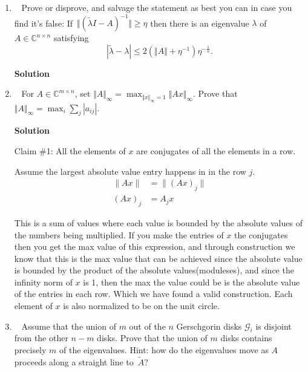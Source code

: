 \documentclass[11pt]{article}
\newcommand\score[1]{\marginpar{\vspace{-2ex}\color{blue}{#1/3}}\hspace{-1ex}}
\newcommand\0{\mathbf{0}}
\newcommand\CC{\mathbb{C}}
\newcommand\<{\langle}
\renewcommand\>{\rangle}
\begin{document}
\begin{enumerate}
Let $A^{*}=\frac{A}{\rho(A)+x}$, where $x>0$. Since $\rho(A/k)=|1/k|\rho(A)$,
$\rho(A^{*})<1$. By the results of the previous question $\lim_{k\rightarrow \infty} (\nu((A^*)^{k}))<1$, since 
it is submultiplicative.

This also means also $(\nu((A^{*})^{k}))^{1/k}<1$. Decomposing to our original expression,
$(\rho(A)+x)\nu((A^{k}))^{1/k}<1$, if you take the sequence $x=1/k$, we see that this converges to $\nu(A^{k})^{1/k}=\rho(A)$ since
$\rho(A^{k})\geq \rho(A)^{k}$, for any consistent norm $\nu$.

\item\ \score{}%
Prove or disprove, and salvage the statement as best you can in case
you find it's false:
%
If~$\Vert(\tilde\lambda I - A)^{-1}\Vert \geq \eta$ then there is an
eigenvalue $\lambda$ of~$A \in \CC^{n \times n}$ satisfying
$$%
  |\tilde\lambda - \lambda| \leq 2(\Vert A\Vert + \eta^{-1})\eta^{-\frac1n}.
$$%

\textbf{Solution}



\item\ \score{}%
For $A \in \CC^{m \times n}$, set $\Vert A\Vert_\infty =
\displaystyle\max_{\Vert x \Vert_\infty = 1} \Vert Ax\Vert_\infty$.
Prove that $\Vert A\Vert_\infty = \displaystyle\max_i \sum_j
|a_{ij}|$.


\textbf{Solution}

Claim \#1: All the elements of $x$ are conjugates of all the elements in a row.

Assume the largest absolute value entry happens in in the row $j$.
\begin{align*}
  \|Ax\|&=\|(Ax)_{j}\|\\
  (Ax)_{j}&= A_{j}x
\end{align*}

This is a sum of values where each value is bounded by the absolute values of the 
numbers being multiplied. If you make the entries of $x$ the conjugates then you 
get the max value of this expression, and through construction we know that 
this is the max value that can be achieved since the absolute value is bounded by the 
product of the absolute values(moduleses), and since the infinity norm of $x$ is 1, then the max the 
value could be is the absolute value of the entries in each row. Which we have found a 
valid construction. Each element of $x$ is also normalized to be on the unit circle.

\item\ \score{}%
Assume that the union of $m$ out of the $n$ Gerschgorin disks
$\mathcal{G}_i$ is disjoint from the other $n - m$ disks.  Prove that
the union of $m$ disks contains precisely $m$ of the eigenvalues.
Hint: how do the eigenvalues move as $A$ proceeds along a straight
line to~$\widetilde A$?


\end{enumerate}
\end{document}
